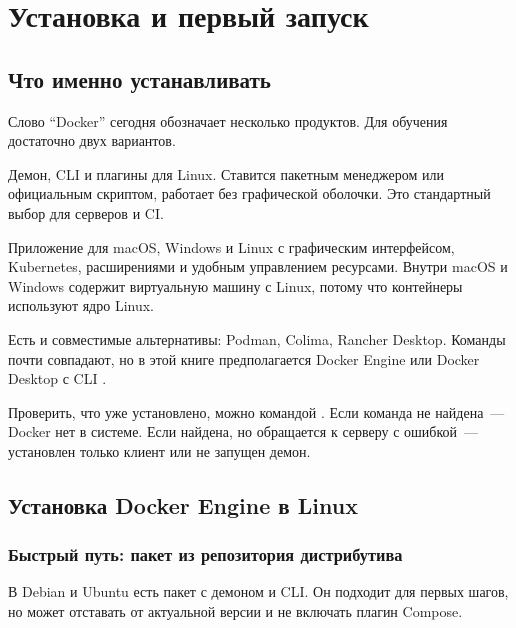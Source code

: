 \chapter{Установка и первый запуск}

\section{Что именно устанавливать}

Слово \enquote{Docker} сегодня обозначает несколько продуктов. Для обучения
достаточно двух вариантов.

\begin{description}[style=nextline]
  \item[Docker Engine] Демон, CLI и плагины для Linux. Ставится пакетным
        менеджером или официальным скриптом, работает без графической
        оболочки. Это стандартный выбор для серверов и CI.
  \item[Docker Desktop] Приложение для macOS, Windows и Linux с графическим
        интерфейсом, Kubernetes, расширениями и удобным управлением
        ресурсами. Внутри macOS и Windows содержит виртуальную машину
        с Linux, потому что контейнеры используют ядро Linux.
\end{description}

Есть и совместимые альтернативы: Podman, Colima, Rancher Desktop.
Команды почти совпадают, но в этой книге предполагается Docker Engine
или Docker Desktop с CLI .

\begin{notebox}
Проверить, что уже установлено, можно командой .
Если команда не найдена~--- Docker нет в системе. Если найдена,
но обращается к серверу с ошибкой~--- установлен только клиент
или не запущен демон.
\end{notebox}

\section{Установка Docker Engine в Linux}

\subsection{Быстрый путь: пакет из репозитория дистрибутива}

В Debian и Ubuntu есть пакет  с демоном и CLI.
Он подходит для первых шагов, но может отставать от актуальной версии
и не включать плагин Compose.

